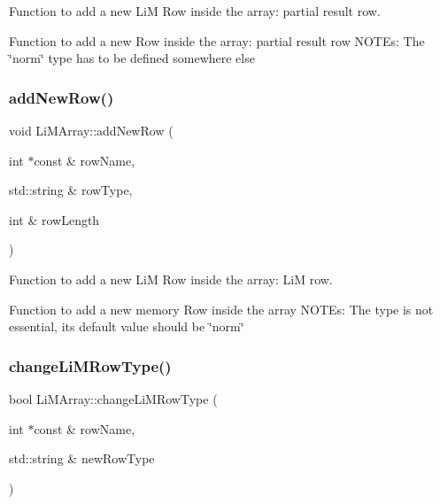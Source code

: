 Function to add a new LiM Row inside the array\+: partial result row. 

Function to add a new Row inside the array\+: partial result row N\+O\+T\+Es\+: The \char`\"{}norm\char`\"{} type has to be defined somewhere else \mbox{\label{classoctantis_1_1LiMArray_a6c300ff9df7342e8593e2db9f265cbd2}} 
\subsubsection{\texorpdfstring{add\+New\+Row()}{addNewRow()}}
{\footnotesize\ttfamily void Li\+M\+Array\+::add\+New\+Row (\begin{DoxyParamCaption}\item[{int $\ast$const \&}]{row\+Name,  }\item[{std\+::string \&}]{row\+Type,  }\item[{int \&}]{row\+Length }\end{DoxyParamCaption})}



Function to add a new LiM Row inside the array\+: LiM row. 

Function to add a new memory Row inside the array N\+O\+T\+Es\+: The type is not essential, its default value should be \char`\"{}norm\char`\"{} \mbox{\label{classoctantis_1_1LiMArray_acc1bcd7ac09e11848c885a116ae18d8c}} 
\subsubsection{\texorpdfstring{change\+Li\+M\+Row\+Type()}{changeLiMRowType()}}
{\footnotesize\ttfamily bool Li\+M\+Array\+::change\+Li\+M\+Row\+Type (\begin{DoxyParamCaption}\item[{int $\ast$const \&}]{row\+Name,  }\item[{std\+::string \&}]{new\+Row\+Type }\end{DoxyParamCaption})}



